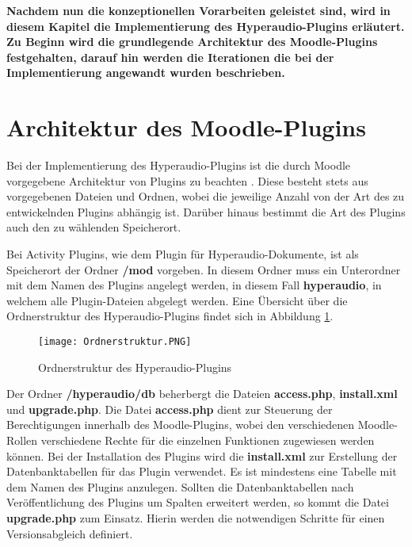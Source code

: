 \textbf{Nachdem nun die konzeptionellen Vorarbeiten geleistet sind, wird in diesem Kapitel die Implementierung des Hyperaudio-Plugins erläutert. Zu Beginn wird die grundlegende Architektur des Moodle-Plugins festgehalten, darauf hin werden die Iterationen die bei der Implementierung angewandt wurden beschrieben.}

\section{Architektur des Moodle-Plugins}
\label{sec:architektur}
Bei der Implementierung des Hyperaudio-Plugins ist die durch Moodle vorgegebene Architektur von Plugins zu beachten \citep{moodle2016activity}. Diese besteht stets aus vorgegebenen Dateien und Ordnen, wobei die jeweilige Anzahl von der Art des zu entwickelnden Plugins abhängig ist. Darüber hinaus bestimmt die Art des Plugins auch den zu wählenden Speicherort.

Bei Activity Plugins, wie dem Plugin für Hyperaudio-Dokumente, ist als Speicherort der Ordner \textbf{/mod} vorgeben. In diesem Ordner muss ein Unterordner mit dem Namen des Plugins angelegt werden, in diesem Fall \textbf{hyperaudio}, in welchem alle Plugin-Dateien abgelegt werden. Eine Übersicht über die Ordnerstruktur des Hyperaudio-Plugins findet sich in Abbildung \ref{fig:Ordnerstruktur}.

\begin{figure}[h!]
\texttt{[image: Ordnerstruktur.PNG]}
\caption{\label{fig:Ordnerstruktur}Ordnerstruktur des Hyperaudio-Plugins}
\end{figure}


Der Ordner \textbf{/hyperaudio/db} beherbergt die Dateien \textbf{access.php}, \textbf{install.xml} und \textbf{upgrade.php}. Die Datei \textbf{access.php} dient zur Steuerung der Berechtigungen innerhalb des Moodle-Plugins, wobei den verschiedenen Moodle-Rollen verschiedene Rechte für die einzelnen Funktionen zugewiesen werden können. Bei der Installation des Plugins wird die \textbf{install.xml} zur Erstellung der Datenbanktabellen für das Plugin verwendet. Es ist mindestens eine Tabelle mit dem Namen des Plugins anzulegen. Sollten die Datenbanktabellen nach Veröffentlichung des Plugins um Spalten erweitert werden, so kommt die Datei \textbf{upgrade.php} zum Einsatz. Hierin werden die notwendigen Schritte für einen Versionsabgleich definiert.

